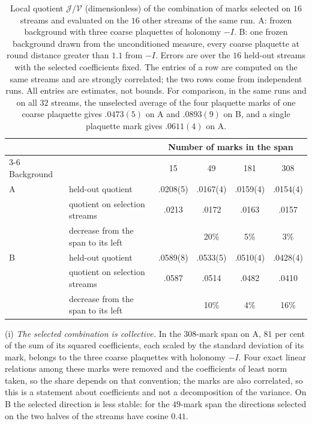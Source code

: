 \begin{table}[ht]
\centering\small
\begin{tabular}{@{}llcccc@{}}
\toprule
 & & \multicolumn{4}{c}{Number of marks in the span} \\
\cmidrule(l){3-6}
Background & & 15 & 49 & 181 & 308 \\
\midrule
A & held-out quotient  & .0208(5) & .0167(4) & .0159(4) & .0154(4) \\
  & quotient on selection streams & .0213 & .0172 & .0163 & .0157 \\
  & decrease from the span to its left &  & 20\% & 5\% & 3\% \\
\addlinespace
B & held-out quotient  & .0589(8) & .0533(5) & .0510(4) & .0428(4) \\
  & quotient on selection streams & .0587 & .0514 & .0482 & .0410 \\
  & decrease from the span to its left &  & 10\% & 4\% & 16\% \\
\bottomrule
\end{tabular}
\caption{Local quotient $\mathcal J/\mathcal V$ (dimensionless) of the combination of marks selected on $16$
streams and evaluated on the $16$ other streams of the same run. A: frozen background with three coarse
plaquettes of holonomy $-I$. B: one frozen background drawn from the unconditioned measure, every coarse
plaquette at round distance greater than $1.1$ from $-I$. Errors are over the $16$ held-out streams with the
selected coefficients fixed. The entries of a row are computed on the same streams and are strongly
correlated; the two rows come from independent runs. All entries are estimates, not bounds. For comparison,
in the same runs and on all $32$ streams, the unselected average of the four plaquette marks of one coarse
plaquette gives $.0473(5)$ on A and $.0893(9)$ on B, and a single plaquette mark gives $.0611(4)$ on A.}
\label{tab:local}
\end{table}

(i) \emph{The selected combination is collective.} In the $308$-mark span on A, $81$ per cent of the sum of
its squared coefficients, each scaled by the standard deviation of its mark, belongs to the three coarse
plaquettes with holonomy $-I$. Four exact linear relations among these marks were removed and the
coefficients of least norm taken, so the share depends on that convention; the marks are also correlated, so
this is a statement about coefficients and not a decomposition of the variance. On B the
selected direction is less stable: for the $49$-mark span the directions selected on the two halves of the
streams have cosine $0.41$.


